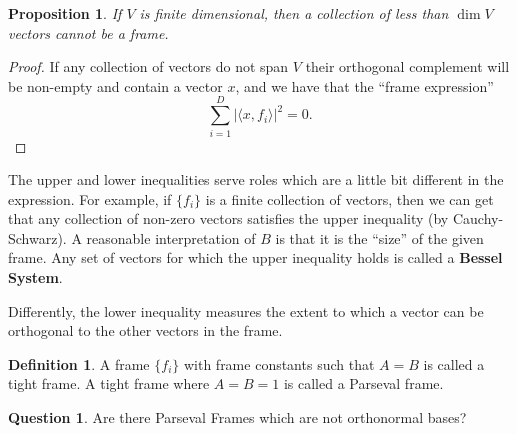 \documentclass[12pt]{article}
\theoremstyle{plain}
\newtheorem{prop}{Proposition}
\theoremstyle{definition}
\newtheorem{defn}{Definition}
\newtheorem{question}{Question}
\begin{document}
\begin{prop}
If $V$ is finite dimensional, then a collection of less than $\dim{V}$ vectors cannot be a frame.
\end{prop}
\begin{proof}
If any collection of vectors do not span $V$ their orthogonal complement will be non-empty and contain a vector $x$, and we have that the ``frame expression''
\[\sum_{i = 1}^D|\langle x, f_i\rangle|^2 = 0.\]
\end{proof}

The upper and lower inequalities serve roles which are a little bit different in the expression.
For example, if $\{f_i\}$ is a finite collection of vectors, then we can get that any collection of non-zero vectors satisfies the upper inequality (by Cauchy-Schwarz). A reasonable interpretation of $B$ is that it is the ``size'' of the given frame. Any set of vectors for which the upper inequality holds is called a \textbf{Bessel System}.

Differently, the lower inequality measures the extent to which a vector can be orthogonal to the other vectors in the frame.

\begin{defn}
	A frame $\{f_i\}$ with frame constants such that $A = B$ is called a tight frame. A tight frame where $A = B = 1$ is called a Parseval frame.
\end{defn}

\begin{question}
Are there Parseval Frames which are not orthonormal bases?
\end{question}
\end{document}
